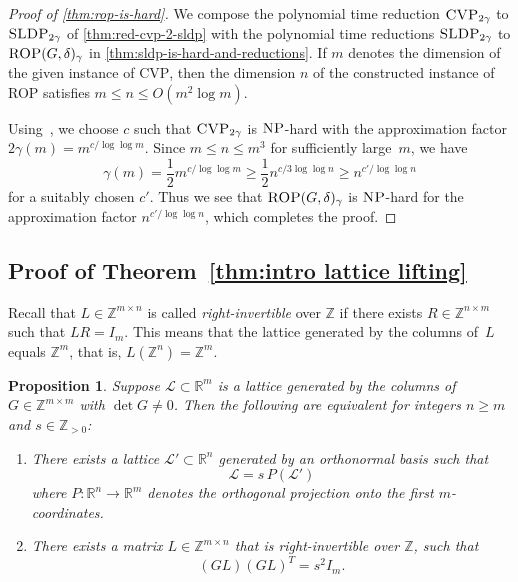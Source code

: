\documentclass[10pt,a4paper]{article}
\newtheorem{proposition}[theorem]{Proposition}
\theoremstyle{definition}
\newcommand{\ZZ}{\mathbb{Z}}
\newcommand{\RR}{\mathbb{R}}
\numberwithin{equation}{section}
\begin{document}
\begin{proof}[Proof of \cref{thm:rop-is-hard}]
We compose the polynomial time reduction
$\textsc{CVP}_{2\gamma}$ to $\textsc{SLDP}_{2\gamma}$
of \cref{thm:red-cvp-2-sldp}
with the  polynomial time  reductions
$\textsc{SLDP}_{2\gamma}$ to $\textsc{ROP}(G,\delta)_{\gamma}$
in \cref{thm:sldp-is-hard-and-reductions}.
If $m$ denotes the dimension of the given instance of \textsc{CVP},
then the dimension $n$ of the constructed instance of \textsc{ROP}
satisfies $m\le n \le O(m^2 \log m)$.


Using~\cite{dinurcvp}, we choose $c$ such that
$\textsc{CVP}_{2\gamma}$ is $\textsc{NP}$-hard
with the approximation factor
$2\gamma(m) = m^{c/\log\log m}$.
Since $m\le n \le m^3$ for sufficiently large~$m$,
we have
\[ \gamma(m)=\frac{1}{2}m^{c/\log\log m} \geq \frac{1}{2}n^{c/3\log\log n} \geq n^{c'/\log\log n}
\] for a suitably chosen $c'$.
Thus we see that $\textsc{ROP}(G,\delta)_{\gamma}$ is
$\textsc{NP}$-hard for the approximation factor
$n^{c'/\log\log n}$,
which completes the proof.
\end{proof}


\subsection{Proof of Theorem~\ref{thm:intro lattice lifting}}\label{sec:eutactic}
Recall that $L\in\ZZ^{m\times n}$ %
is called \textit{right-invertible} over $\ZZ$
if there exists $R\in\ZZ^{n\times m}$ such that $LR=I_m$.
This means that the lattice generated by the columns of~$L$ equals $\ZZ^m$, that is, $L(\ZZ^n) = \ZZ^m$.

\begin{proposition}\label{prop:eutactic}
Suppose $\mathcal{L}\subset\RR^m$ is a lattice generated by the columns of $G\in\ZZ^{m\times m}$ with $\det G\neq 0$.
Then the following are equivalent for integers $n\geq m$ and $s\in\ZZ_{>0}$:
\begin{enumerate}[(1)]
\item\label{it:eutactic 1} There exists a lattice $\mathcal{L}'\subset\RR^n$ generated by an orthonormal basis such that
\[
  \mathcal{L} = s\, P(\mathcal{L}')
\]
where $P:\RR^n\rightarrow\RR^m$ denotes the orthogonal projection onto the first $m$-coordinates.

\item\label{it:eutactic 2} There exists a matrix $L\in\ZZ^{m\times n}$ that is right-invertible over $\ZZ$, such that
\[
(GL)(GL)^T = s^2 I_m.
\]
\end{enumerate}
\end{proposition}
\end{document}
